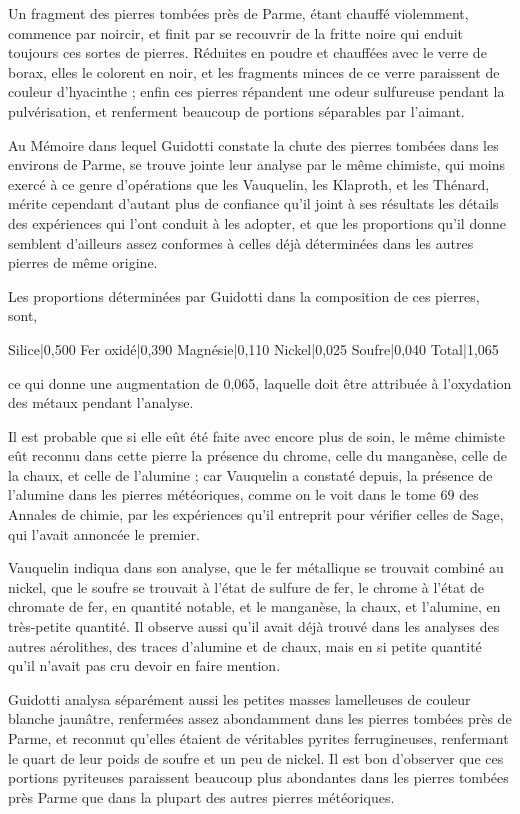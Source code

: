 \documentclass[a4paper, 12pt, oneside, french]{article}
\begin{document}
Un fragment des pierres tombées près de Parme, étant chauffé violemment, commence par noircir, et finit par se recouvrir de la fritte noire qui enduit toujours ces sortes de pierres. Réduites en poudre et chauffées avec le verre de borax, elles le colorent en noir, et les fragments minces de ce verre paraissent de couleur d'hyacinthe ; enfin ces pierres répandent une odeur sulfureuse pendant la pulvérisation, et renferment beaucoup de portions séparables par l'aimant.

Au Mémoire dans lequel Guidotti constate la chute des pierres tombées dans les environs de Parme, se trouve jointe leur analyse par le même chimiste, qui moins exercé à ce genre d'opérations que les Vauquelin, les Klaproth, et les Thénard, mérite cependant d'autant plus de confiance qu'il joint à ses résultats les détails des expériences qui l'ont conduit à les adopter, et que les proportions qu'il donne semblent d'ailleurs assez conformes à celles déjà déterminées dans les autres pierres de même origine.

Les proportions déterminées par Guidotti dans la composition de ces pierres, sont,

Silice|0,500  
Fer oxidé|0,390  
Magnésie|0,110  
Nickel|0,025  
Soufre|0,040  
Total|1,065  

ce qui donne une augmentation de 0,065, laquelle doit être attribuée à l'oxydation des métaux pendant l'analyse.

Il est probable que si elle eût été faite avec encore plus de soin, le même chimiste eût reconnu dans cette pierre la présence du chrome, celle du manganèse, celle de la chaux, et celle de l'alumine ; car Vauquelin a constaté depuis, la présence de l'alumine dans les pierres météoriques, comme on le voit dans le tome 69 des Annales de chimie, par les expériences qu'il entreprit pour vérifier celles de Sage, qui l'avait annoncée le premier.

Vauquelin indiqua dans son analyse, que le fer métallique se trouvait combiné au nickel, que le soufre se trouvait à l'état de sulfure de fer, le chrome à l'état de chromate de fer, en quantité notable, et le manganèse, la chaux, et l'alumine, en très-petite quantité. Il observe aussi qu'il avait déjà trouvé dans les analyses des autres aérolithes, des traces d'alumine et de chaux, mais en si petite quantité qu'il n'avait pas cru devoir en faire mention.

Guidotti analysa séparément aussi les petites masses lamelleuses de couleur blanche jaunâtre, renfermées assez abondamment dans les pierres tombées près de Parme, et reconnut qu'elles étaient de véritables pyrites ferrugineuses, renfermant le quart de leur poids de soufre et un peu de nickel. Il est bon d'observer que ces portions pyriteuses paraissent beaucoup plus abondantes dans les pierres tombées près Parme que dans la plupart des autres pierres météoriques.
\end{document}

